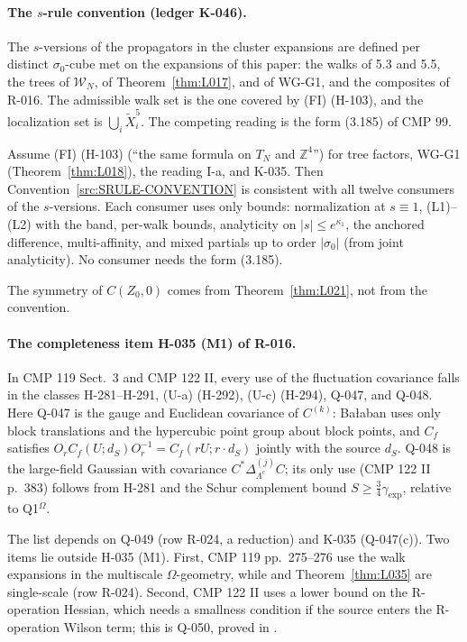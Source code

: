 \paragraph{The $s$-rule convention (ledger K-046).}
\begin{convention}\label{src:SRULE-CONVENTION}
The $s$-versions of the propagators in the cluster expansions are defined per distinct $\sigma_0$-cube met on the expansions of this paper: the walks of  5.3 and 5.5, the trees of $\mathcal W_N$, of Theorem~\ref{thm:L017}, and of WG-G1, and the composites of R-016. The admissible walk set is the one covered by (FI) (H-103), and the localization set is $\bigcup_i\tilde X_i^5$. The competing reading is the form (3.185) of CMP 99.
\end{convention}
\begin{proposition}\label{src:SRULE}
Assume (FI) (H-103) (``the same formula on $T_N$ and $\mathbb Z^4$'') for tree factors, WG-G1 (Theorem~\ref{thm:L018}), the reading I-a, and K-035. Then Convention~\ref{src:SRULE-CONVENTION} is consistent with all twelve consumers of the $s$-versions. Each consumer uses only bounds: normalization at $s\equiv1$, (L1)--(L2) with the band, per-walk bounds, analyticity on $|s|\le e^{\kappa_1}$, the anchored difference, multi-affinity, and mixed partials up to order $|\sigma_0|$ (from joint analyticity). No consumer needs the form (3.185).
\end{proposition}
The symmetry of $C(Z_0,0)$ comes from Theorem~\ref{thm:L021}, not from the convention.

\paragraph{The completeness item H-035 (M1) of R-016.}
\begin{proposition}\label{src:M1-SWEEP}
In CMP 119 Sect.~3 and CMP 122 II, every use of the fluctuation covariance falls in the classes H-281--H-291, (U-a) (H-292), (U-c) (H-294), Q-047, and Q-048. Here Q-047 is the gauge and Euclidean covariance of $C^{(k)}$: Ba{\l}aban uses only block translations and the hypercubic point group about block points, and $C_f$ satisfies $O_rC_f(U;d_S)O_r^{-1}=C_f(rU;r\cdot d_S)$ jointly with the source $d_S$. Q-048 is the large-field Gaussian with covariance $C^*\Delta^{(j)}_{\Lambda^c}C$; its only use (CMP 122 II p.~383) follows from H-281 and the Schur complement bound $S\ge\frac34\gamma_{\exp}$, relative to Q1$^\Omega$.
\end{proposition}
The list depends on Q-049 (row R-024, a reduction) and K-035 (Q-047(c)). Two items lie outside H-035 (M1). First, CMP 119 pp.~275--276 use the walk expansions in the multiscale $\Omega$-geometry, while  and Theorem~\ref{thm:L035} are single-scale (row R-024). Second, CMP 122 II uses a lower bound on the R-operation Hessian, which needs a smallness condition if the source enters the R-operation Wilson term; this is Q-050, proved in .

